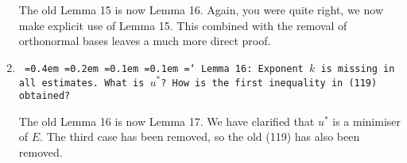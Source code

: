 \documentclass[12pt]{article}
\newcommand*\justify{%
	\fontdimen2\font=0.4em%
	\fontdimen3\font=0.2em%
	\fontdimen4\font=0.1em%
	\fontdimen7\font=0.1em%
	\hyphenchar\font=`\-%
}
\newcommand{\review}[1]{\texttt{\justify{#1}}}
\begin{document}
\begin{enumerate}
	The old Lemma 15 is now Lemma 16. Again, you were quite right, we now make explicit use of Lemma 15. This combined with the removal of orthonormal bases leaves a much more direct proof.
	
	\item \review{Lemma 16: Exponent $k$ is missing in all estimates. What is $u^*$? How is the first inequality in (119) obtained?}
	
	The old Lemma 16 is now Lemma 17. We have clarified that $u^*$ is a minimiser of $E$. The third case has been removed, so the old (119) has also been removed.
\end{enumerate}
\end{document}
